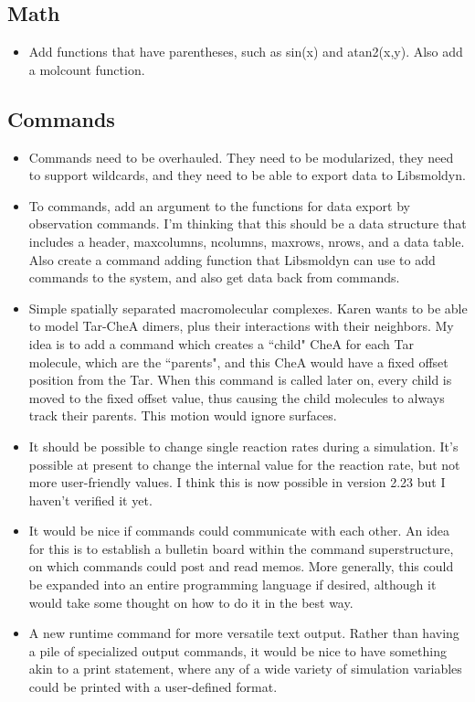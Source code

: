 \documentclass {scrbook}
\begin{document}
\subsection*{Math}
\begin{itemize}
\item Add functions that have parentheses, such as sin(x) and atan2(x,y). Also add a molcount function.
\end{itemize}

\subsection*{Commands}
\begin{itemize}
\item Commands need to be overhauled. They need to be modularized, they need to support wildcards, and they need to be able to export data to Libsmoldyn.
\item To commands, add an argument to the functions for data export by observation commands. I'm thinking that this should be a data structure that includes a header, maxcolumns, ncolumns, maxrows, nrows, and a data table. Also create a command adding function that Libsmoldyn can use to add commands to the system, and also get data back from commands.
\item Simple spatially separated macromolecular complexes. Karen wants to be able to model Tar-CheA dimers, plus their interactions with their neighbors. My idea is to add a command which creates a ``child" CheA for each Tar molecule, which are the ``parents", and this CheA would have a fixed offset position from the Tar. When this command is called later on, every child is moved to the fixed offset value, thus causing the child molecules to always track their parents. This motion would ignore surfaces.
\item It should be possible to change single reaction rates during a simulation. It's possible at present to change the internal value for the reaction rate, but not more user-friendly values. I think this is now possible in version 2.23 but I haven't verified it yet.
\item It would be nice if commands could communicate with each other. An idea for this is to establish a bulletin board within the command superstructure, on which commands could post and read memos. More generally, this could be expanded into an entire programming language if desired, although it would take some thought on how to do it in the best way.
\item A new runtime command for more versatile text output. Rather than having a pile of specialized output commands, it would be nice to have something akin to a print statement, where any of a wide variety of simulation variables could be printed with a user-defined format.
\end{itemize}
\end{document}
